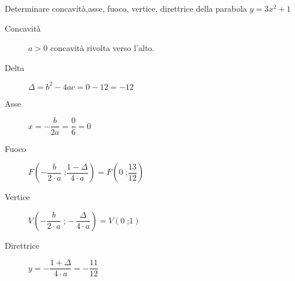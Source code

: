 	Determinare concavità,asse, fuoco, vertice, direttrice della parabola $y=3x^2+1$
	\begin{description}
		\item[Concavità] $a>0$ concavità rivolta verso l'alto.
		\item[Delta] $\Delta=b^2-4ac=0-12=-12$
		\item[Asse] $x=-\dfrac{b}{2a}=\dfrac{0}{6}=0$
		\item[Fuoco] $F\left(-\dfrac{b}{2\cdot a}\;\text{;}\dfrac{1-\Delta}{4\cdot a}\right)=F\left(0\;\text{;}\dfrac{13}{12}\right)$
		\item[Vertice] $V\left(-\dfrac{b}{2\cdot a}\;\text{;}-\dfrac{\Delta}{4\cdot a}\right)=V\left(0\;\text{;}1\right)$
		\item[Direttrice] $y=-\dfrac{1+\Delta}{4\cdot a}=-\dfrac{11}{12}$
	\end{description}

